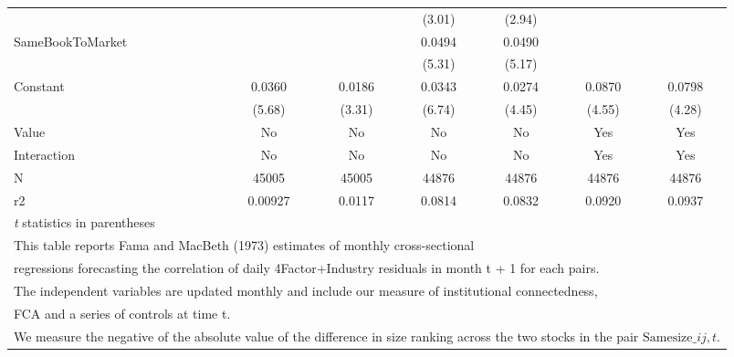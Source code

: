 {\begin{tabular}{l*{6}{c}}
                    &                     &                     &      (3.01)         &      (2.94)         &                     &                     \\
[1em]
SameBookToMarket    &                     &                     &      0.0494\sym{***}&      0.0490\sym{***}&                     &                     \\
                    &                     &                     &      (5.31)         &      (5.17)         &                     &                     \\
[1em]
Constant            &      0.0360\sym{***}&      0.0186\sym{**} &      0.0343\sym{***}&      0.0274\sym{***}&      0.0870\sym{***}&      0.0798\sym{***}\\
                    &      (5.68)         &      (3.31)         &      (6.74)         &      (4.45)         &      (4.55)         &      (4.28)         \\
\hline
Value               &          No         &          No         &          No         &          No         &         Yes         &         Yes         \\
Interaction         &          No         &          No         &          No         &          No         &         Yes         &         Yes         \\
N                   &       45005         &       45005         &       44876         &       44876         &       44876         &       44876         \\
r2                  &     0.00927         &      0.0117         &      0.0814         &      0.0832         &      0.0920         &      0.0937         \\
\hline\hline
\multicolumn{7}{l}{\footnotesize \textit{t} statistics in parentheses}\\
\multicolumn{7}{l}{\footnotesize This table reports Fama and MacBeth (1973) estimates of monthly cross-sectional}\\
\multicolumn{7}{l}{\footnotesize  regressions forecasting the correlation of daily 4Factor+Industry residuals in month t + 1 for each pairs.}\\
\multicolumn{7}{l}{\footnotesize The independent variables are updated monthly and include our measure of institutional connectedness,}\\
\multicolumn{7}{l}{\footnotesize  FCA and a series of controls at time t.}\\
\multicolumn{7}{l}{\footnotesize We measure the negative of the absolute value of the difference in size ranking across the two stocks in the pair $ \text{Samesize}\_{ij,t} $.}\\

\end{tabular}}
